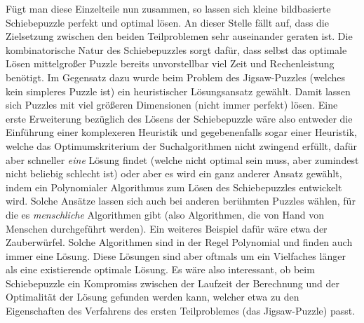 \documentclass{whswinvcbook}
\begin{document}
Fügt man diese Einzelteile nun zusammen, so lassen sich kleine bildbasierte Schiebepuzzle perfekt und optimal lösen. An dieser Stelle fällt auf, dass die Zielsetzung zwischen den beiden Teilproblemen sehr auseinander geraten ist. Die kombinatorische Natur des Schiebepuzzles sorgt dafür, dass selbst das optimale Lösen mittelgroßer Puzzle bereits unvorstellbar viel Zeit und Rechenleistung benötigt. Im Gegensatz dazu wurde beim Problem des Jigsaw-Puzzles (welches kein simpleres Puzzle ist) ein heuristischer Lösungsansatz gewählt. Damit lassen sich Puzzles mit viel größeren Dimensionen (nicht immer perfekt) lösen. Eine erste Erweiterung bezüglich des Lösens der Schiebepuzzle wäre also entweder die Einführung einer komplexeren Heuristik und gegebenenfalls sogar einer Heuristik, welche das Optimumskriterium der Suchalgorithmen nicht zwingend erfüllt, dafür aber schneller \textit{eine} Lösung findet (welche nicht optimal sein muss, aber zumindest nicht beliebig schlecht ist) oder aber es wird ein ganz anderer Ansatz gewählt, indem ein Polynomialer Algorithmus zum Lösen des Schiebepuzzles entwickelt wird. Solche Ansätze lassen sich auch bei anderen berühmten Puzzles wählen, für die es \textit{menschliche} Algorithmen gibt (also Algorithmen, die von Hand von Menschen durchgeführt werden). Ein weiteres Beispiel dafür wäre etwa der Zauberwürfel. Solche Algorithmen sind in der Regel Polynomial und finden auch immer eine Lösung. Diese Lösungen sind aber oftmals um ein Vielfaches länger als eine existierende optimale Lösung. Es wäre also interessant, ob beim Schiebepuzzle ein Kompromiss zwischen der Laufzeit der Berechnung und der Optimalität der Lösung gefunden werden kann, welcher etwa zu den Eigenschaften des Verfahrens des ersten Teilproblemes (das Jigsaw-Puzzle) passt.

\backmatter

\preparebibliography
\nocite{*}

\end{document}
